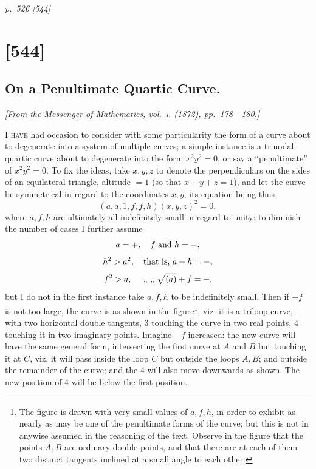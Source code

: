 \documentclass[11pt,a4paper]{article}
\theoremstyle{plain}
\theoremstyle{definition}
\newcommand{\sourcepage}[2]{%
  \bigskip
  \noindent\textit{p.~#1 [#2]}%
  \par\smallskip
}
\begin{document}
\clearpage

\sourcepage{526}{544}
\section{[544]}
\subsection{On a Penultimate Quartic Curve.}

\begin{center}
\textit{[From the Messenger of Mathematics, vol.~\textsc{i}. (1872), pp.~178---180.]}
\end{center}

\textsc{I have} had occasion to consider with some particularity the form of a
curve about to degenerate into a system of multiple curves; a simple instance
is a trinodal quartic curve about to degenerate into the form $x^2y^2=0$,
or say a ``penultimate'' of $x^2y^2=0$. To fix the ideas, take $x,y,z$ to
denote the perpendiculars on the sides of an equilateral triangle,
altitude $=1$ (so that $x+y+z=1$), and let the curve be symmetrical in
regard to the coordinates $x,y$, its equation being thus
\[
(a,a,1,f,f,h)(x,y,z)^2=0,
\]
where $a,f,h$ are ultimately all indefinitely small in regard to unity: to
diminish the number of cases I further assume
\[
a=+,\quad f\ \hbox{and}\ h=-,
\]
\[
h^2>a^2,\quad \hbox{that is, } a+h=-,
\]
\[
f^2>a,\quad \hbox{ ,, ,, } \sqrt{(a)}+f=-,
\]
but I do not in the first instance take $a,f,h$ to be indefinitely small.
Then if $-f$ is not too large, the curve is as shown in the figure\footnote{The
figure is drawn with very small values of $a,f,h$, in order to exhibit as
nearly as may be one of the penultimate forms of the curve; but this is not
in anywise assumed in the reasoning of the text. Observe in the figure that
the points $A,B$ are ordinary double points, and that there are at each of
them two distinct tangents inclined at a small angle to each other.}, viz. it
is a triloop curve, with two horizontal double tangents, 3 touching the curve
in two real points, 4 touching it in two imaginary points. Imagine $-f$
increased: the new curve will have the same general form, intersecting the
first curve at $A$ and $B$ but touching it at $C$, viz. it will pass inside
the loop $C$ but outside the loops $A,B$; and outside the remainder of the
curve; and the 4 will also move downwards as shown. The new position of 4
will be below the first position.
\end{document}
